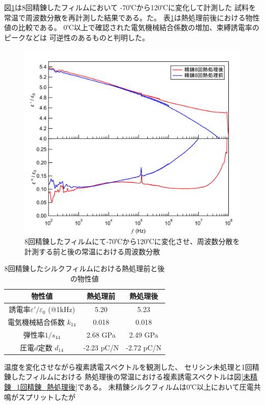 \documentclass[dvipdfmx,12pt,a4paper]{jreport}
\begin{document}
			図\ref{熱処理後の誘電率}は8回精錬したフィルムにおいて
			-70℃から120℃に変化して計測した
			試料を常温で周波数分散を再計測した結果である。た。
			表\ref{8回_熱処理前後_物性値}は熱処理前後における物性値の比較である。
			0℃以上で確認された電気機械結合係数の増加、束縛誘電率のピークなどは
			可逆性のあるものと判明した。
			\begin{figure}[h]
				\centering
				\includegraphics[width=0.8\linewidth]{8回精錬_熱処理前と後.jpg}
				\caption{8回精錬したフィルムにて-70℃から120℃に変化させ、周波数分散を計測する前と後の常温における周波数分散}
				\label{熱処理後の誘電率}
			\end{figure}
			\begin{table}[H]
				\centering
				\caption{8回精錬したシルクフィルムにおける熱処理前と後の物性値}
				\label{8回_熱処理前後_物性値}
				\begin{tabular}{c c c} \hline
					物性値 & 熱処理前 & 熱処理後  \\ \hline \hline
					誘電率$\varepsilon'/\varepsilon_0$ (@1kHz) & 5.20 & 5.23 \\
					電気機械結合係数 $k_{14}$ & 0.018 & 0.018 \\
					弾性率$1/s_{44}$ &  2.68 GPa & 2.49 GPa \\
					圧電$d$定数 $d_{14}$ & -2.23 pC/N & -2.72 pC/N \\ \hline
				\end{tabular}
			\end{table}
			\newpage
			温度を変化させながら複素誘電スペクトルを観測した、
			セリシン未処理と1回精錬したフィルムにおける
			熱処理後の常温における複素誘電スペクトルは図\ref{未精錬_1回精錬_熱処理後}である。
			未精錬シルクフィルムは0℃以上において圧電共鳴がスプリットしたが
\end{document}
